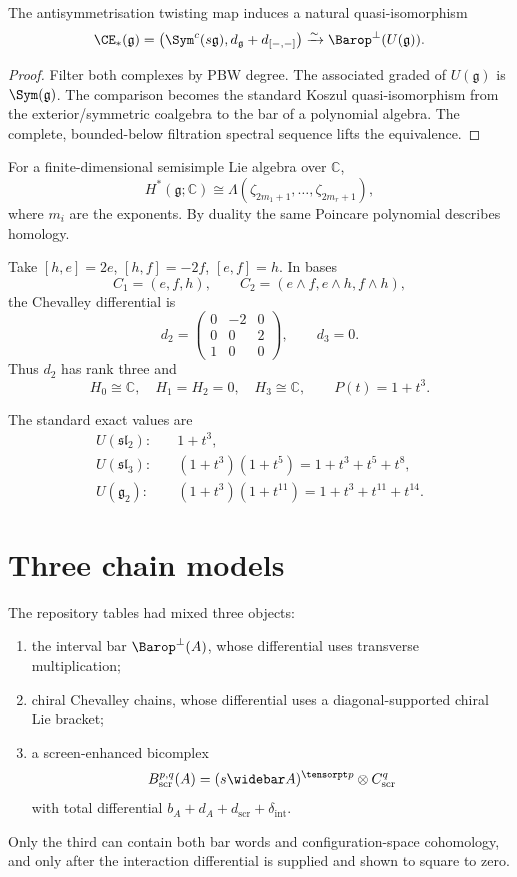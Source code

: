 \begin{theorem}\label{thm:enveloping-bar}
The antisymmetrisation twisting map induces a natural quasi-isomorphism
\[
 \CE_*(\mathfrak g)
 =\bigl(\Sym^c(s\mathfrak g),d_{\mathfrak g}+d_{[-,-]}\bigr)
 \xrightarrow{\sim}
 \Barop^\perp(U(\mathfrak g)).
\]
\end{theorem}
\begin{proof}
Filter both complexes by PBW degree.  The associated graded of \(U(\mathfrak g)\) is \(\Sym(\mathfrak g)\).  The comparison becomes the standard Koszul quasi-isomorphism from the exterior/symmetric coalgebra to the bar of a polynomial algebra.  The complete, bounded-below filtration spectral sequence lifts the equivalence.
\end{proof}

For a finite-dimensional semisimple Lie algebra over \(\mathbb C\),
\[
 H^*(\mathfrak g;\mathbb C)
 \cong\Lambda(\zeta_{2m_1+1},\ldots,\zeta_{2m_r+1}),
\]
where \(m_i\) are the exponents.  By duality the same Poincare polynomial describes homology.

\begin{calcbox}[title={The \(\mathfrak{sl}_2\) chain matrix}]
Take \([h,e]=2e\), \([h,f]=-2f\), \([e,f]=h\).  In bases
\[
 C_1=(e,f,h),\qquad C_2=(e\wedge f,e\wedge h,f\wedge h),
\]
the Chevalley differential is
\[
 d_2=
 \begin{pmatrix}
 0&-2&0\\
 0&0&2\\
 1&0&0
 \end{pmatrix},
 \qquad d_3=0.
\]
Thus \(d_2\) has rank three and
\[
 H_0\cong\mathbb C,
 \quad H_1=H_2=0,
 \quad H_3\cong\mathbb C,
 \qquad P(t)=1+t^3.
\]
\end{calcbox}

The standard exact values are
\begin{align*}
 U(\mathfrak{sl}_2):&\quad 1+t^3,\\
 U(\mathfrak{sl}_3):&\quad(1+t^3)(1+t^5)=1+t^3+t^5+t^8,\\
 U(\mathfrak g_2):&\quad(1+t^3)(1+t^{11})=1+t^3+t^{11}+t^{14}.
\end{align*}

\section{Three chain models}
The repository tables had mixed three objects:
\begin{enumerate}
\item the interval bar \(\Barop^\perp(A)\), whose differential uses transverse multiplication;
\item chiral Chevalley chains, whose differential uses a diagonal-supported chiral Lie bracket;
\item a screen-enhanced bicomplex
\[
 B^{p,q}_{\mathrm{scr}}(A)=
 (s\widebar A)^{\tensorpt p}\otimes C^q_{\mathrm{scr}}
\]
with total differential \(b_A+d_A+d_{\mathrm{scr}}+\delta_{\mathrm{int}}\).
\end{enumerate}
Only the third can contain both bar words and configuration-space cohomology, and only after the interaction differential is supplied and shown to square to zero.

